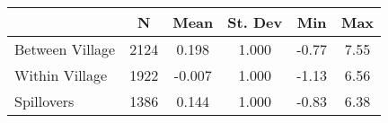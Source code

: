 \begin{tabular}{l*{5}{c}}\hline&\multicolumn{1}{c}{N}&\multicolumn{1}{c}{Mean}&\multicolumn{1}{c}{St. Dev}&\multicolumn{1}{c}{Min}&\multicolumn{1}{c}{Max}\\ \hline 
Between Village & 2124 & 0.198 & 1.000 & -0.77 & 7.55 \\
Within Village & 1922 & -0.007 & 1.000 & -1.13 & 6.56 \\
Spillovers & 1386 & 0.144 & 1.000 & -0.83 & 6.38 \\
\hline \end{tabular}
